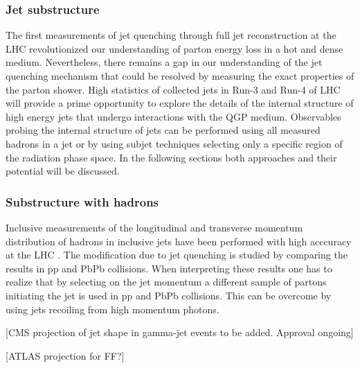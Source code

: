 \subsubsection{Jet substructure}
The first measurements of jet quenching through full jet reconstruction at the LHC revolutionized our understanding of parton energy loss in a hot and dense medium. Nevertheless, there remains a gap in our understanding of the jet quenching mechanism that could be resolved by measuring the exact properties of the parton shower. High statistics of collected jets in Run-3 and Run-4 of LHC will provide a prime opportunity to explore the details of the internal structure of high energy jets that undergo interactions with the QGP medium. Observables probing the internal structure of jets can be performed using all measured hadrons in a jet or by using subjet techniques selecting only a specific region of the radiation phase space. In the following sections both approaches and their potential will be discussed.

\subsubsection{Substructure with hadrons}
Inclusive measurements of the longitudinal and transverse momentum distribution of hadrons in inclusive jets have been performed with high acccuracy at the LHC \cite{Aaboud:2018hpb,Sirunyan:2018jqr}. The modification due to jet quenching is studied by comparing the results in pp and PbPb collisions. When interpreting these results one has to realize that by selecting on the jet momentum a different sample of partons initiating the jet is used in pp and PbPb collisions. This can be overcome by using jets recoiling from high momentum photons. 

[CMS projection of jet shape in gamma-jet events to be added. Approval ongoing]

[ATLAS projection for FF?]


